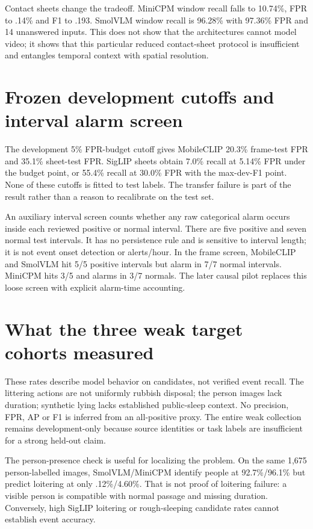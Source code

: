 Contact sheets change the tradeoff. MiniCPM window recall falls to 10.74\%, FPR to .14\% and F1 to .193. SmolVLM window recall is 96.28\% with 97.36\% FPR and 14 unanswered inputs. This does not show that the architectures cannot model video; it shows that this particular reduced contact-sheet protocol is insufficient and entangles temporal context with spatial resolution.

\section{Frozen development cutoffs and interval alarm screen}
The development 5\% FPR-budget cutoff gives MobileCLIP 20.3\% frame-test FPR and 35.1\% sheet-test FPR. SigLIP sheets obtain 7.0\% recall at 5.14\% FPR under the budget point, or 55.4\% recall at 30.0\% FPR with the max-dev-F1 point. None of these cutoffs is fitted to test labels. The transfer failure is part of the result rather than a reason to recalibrate on the test set.

An auxiliary interval screen counts whether any raw categorical alarm occurs inside each reviewed positive or normal interval. There are five positive and seven normal test intervals. It has no persistence rule and is sensitive to interval length; it is not event onset detection or alerts/hour. In the frame screen, MobileCLIP and SmolVLM hit 5/5 positive intervals but alarm in 7/7 normal intervals. MiniCPM hits 3/5 and alarms in 3/7 normals. The later causal pilot replaces this loose screen with explicit alarm-time accounting.

\section{What the three weak target cohorts measured}

These rates describe model behavior on candidates, not verified event recall. The littering actions are not uniformly rubbish disposal; the person images lack duration; synthetic lying lacks established public-sleep context. No precision, FPR, AP or F1 is inferred from an all-positive proxy. The entire weak collection remains development-only because source identities or task labels are insufficient for a strong held-out claim.

The person-presence check is useful for localizing the problem. On the same 1,675 person-labelled images, SmolVLM/MiniCPM identify people at 92.7\%/96.1\% but predict loitering at only .12\%/4.60\%. That is not proof of loitering failure: a visible person is compatible with normal passage and missing duration. Conversely, high SigLIP loitering or rough-sleeping candidate rates cannot establish event accuracy.

